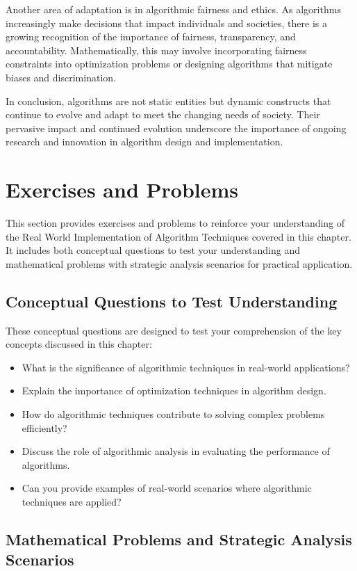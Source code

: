 \documentclass[12pt]{book} %
\begin{document}
Another area of adaptation is in algorithmic fairness and ethics. As algorithms increasingly make decisions that impact individuals and societies, there is a growing recognition of the importance of fairness, transparency, and accountability. Mathematically, this may involve incorporating fairness constraints into optimization problems or designing algorithms that mitigate biases and discrimination.

In conclusion, algorithms are not static entities but dynamic constructs that continue to evolve and adapt to meet the changing needs of society. Their pervasive impact and continued evolution underscore the importance of ongoing research and innovation in algorithm design and implementation.


\section{Exercises and Problems}

This section provides exercises and problems to reinforce your understanding of the Real World Implementation of Algorithm Techniques covered in this chapter. It includes both conceptual questions to test your understanding and mathematical problems with strategic analysis scenarios for practical application.

\subsection{Conceptual Questions to Test Understanding}

These conceptual questions are designed to test your comprehension of the key concepts discussed in this chapter:

\begin{itemize}
    \item What is the significance of algorithmic techniques in real-world applications?
    \item Explain the importance of optimization techniques in algorithm design.
    \item How do algorithmic techniques contribute to solving complex problems efficiently?
    \item Discuss the role of algorithmic analysis in evaluating the performance of algorithms.
    \item Can you provide examples of real-world scenarios where algorithmic techniques are applied?
\end{itemize}

\subsection{Mathematical Problems and Strategic Analysis Scenarios}
\end{document}
